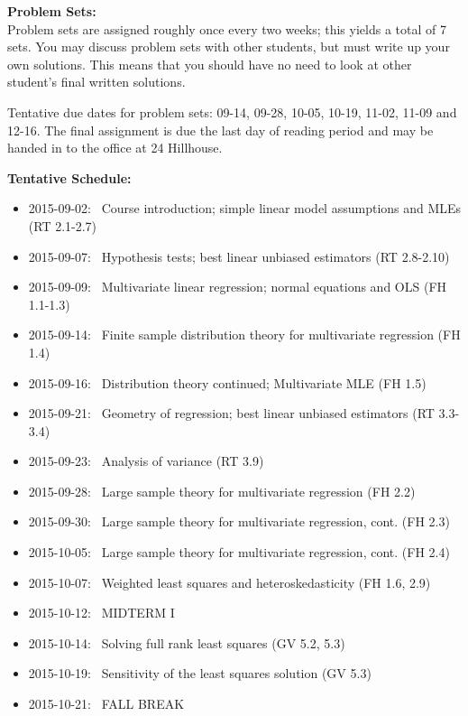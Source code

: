 \documentclass[12pt]{article}
\begin{document}
\vspace{0.5cm}

{\bf Problem Sets:} \\
Problem sets are assigned roughly once every two weeks;
this yields a total of 7 sets.
You may discuss problem sets with other students, but must write up your
own solutions. This means that you should have no need to look at other
student's final written solutions.

\bigskip

Tentative due dates for problem sets: 09-14, 09-28, 10-05, 10-19, 11-02,
11-09 and 12-16. The final assignment is due the last day of reading period
and may be handed in to the office at 24 Hillhouse.

\newpage

{\bf Tentative Schedule:}
\begin{itemize}\setlength\itemsep{0em}
\item 2015-09-02: \, Course introduction; simple linear model assumptions and MLEs (RT 2.1-2.7)
\item 2015-09-07: \, Hypothesis tests; best linear unbiased estimators (RT 2.8-2.10)
\item 2015-09-09: \, Multivariate linear regression; normal equations and OLS (FH 1.1-1.3)
\item 2015-09-14: \, Finite sample distribution theory for multivariate regression (FH 1.4)
\item 2015-09-16: \, Distribution theory continued; Multivariate MLE (FH 1.5)
\item 2015-09-21: \, Geometry of regression; best linear unbiased estimators (RT 3.3-3.4)
\item 2015-09-23: \, Analysis of variance (RT 3.9)
\item 2015-09-28: \, Large sample theory for multivariate regression (FH 2.2)
\item 2015-09-30: \, Large sample theory for multivariate regression, cont. (FH 2.3)
\item 2015-10-05: \, Large sample theory for multivariate regression, cont. (FH 2.4)
\item 2015-10-07: \, Weighted least squares and heteroskedasticity (FH 1.6, 2.9)
\item 2015-10-12: \, MIDTERM I
\item 2015-10-14: \, Solving full rank least squares (GV 5.2, 5.3)
\item 2015-10-19: \, Sensitivity of the least squares solution (GV 5.3)
\item 2015-10-21: \, FALL BREAK

\end{itemize}
\end{document}
